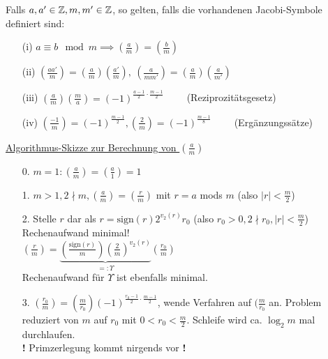 \documentclass[a4paper,twoside,DIV15,BCOR12mm]{scrbook}
\begin{document}
\begin{satz}\label{satz:Jacobisymbol}
    Falls $a, a' \in \mathbb{Z}, m, m' \in \mathbb{Z}$, so gelten, falls die vorhandenen Jacobi-Symbole definiert sind:
    \begin{itemize}
        \item[(i)] $a \equiv b \mod m \implies \left(\frac{a}{m}\right) = \left(\frac{b}{m}\right)$
        \item[(ii)] $\left(\frac{aa'}{m}\right) =
        \left(\frac{a}{m}\right)\left(\frac{a'}{m}\right),\
                    \left(\frac{a}{mm'}\right) = \left(\frac{a}{m}\right)\left(\frac{a}{m'}\right)$
        \item[(iii)] $\left(\frac{a}{m}\right)\left(\frac{m}{a}\right) = (-1)^{\frac{a-1}{2} \cdot \frac{m-1}{2}}\qquad$ (Reziprozitätsgesetz)
        \item[(iv)] $\left(\frac{-1}{m}\right) = (-1)^{\frac{m-1}{2}}, \left(\frac{2}{m}\right) = (-1)^{\frac{m-1}{8}}\qquad$ (Ergänzungssätze)
    \end{itemize}
\end{satz}

\underline{Algorithmus-Skizze zur Berechnung von
$\left(\frac{a}{m}\right)$}
\begin{itemize}
    \item[0.] $m = 1: \left(\frac{a}{m}\right) = \left(\frac{a}{1}\right) = 1$
    \item[1.] $m > 1, 2 \nmid m, \left(\frac{a}{m}\right) = \left(\frac{r}{m}\right)$ mit
        $r = a$ mods $m$ (also $|r| < \frac{m}{2}$)
    \item[2.] Stelle $r$ dar als $r = \text{sign}(r)2^{v_2(r)}r_0$ (also $r_0 > 0, 2 \nmid r_0, |r| < \frac{m}{2}$)\\
        Rechenaufwand minimal!\\
        $\left(\frac{r}{m}\right) = \underbrace{\left(\frac{\text{sign}(r)}{m}\right)\left(\frac{2}{m}\right)^{v_2(r)}}_{=: \Upsilon}(\frac{r_0}{m})$\\
        Rechenaufwand für $\Upsilon$ ist ebenfalls minimal.
    \item[3.] $\left(\frac{r_0}{m}\right) = \left(\frac{m}{r_0}\right)(-1)^{\frac{r_0 - 1}{2} \cdot \frac{m-1}{2}}$,
     wende Verfahren auf $(\frac{m}{r_0}$ an. Problem reduziert von $m$ auf $r_0$ mit $0 < r_0 < \frac{m}{2}$.
     Schleife wird ca. $\log_2 m$ mal durchlaufen.\\
     \textbf{!} Primzerlegung kommt nirgends vor \textbf{!}
\end{itemize}
\end{document}
